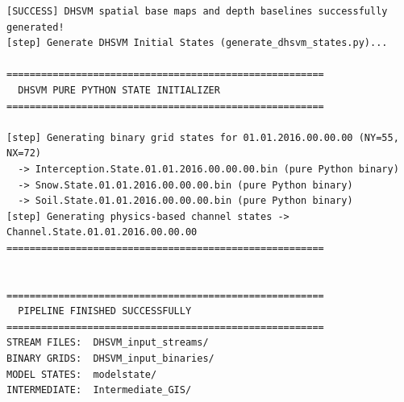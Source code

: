 \documentclass[11pt]{article}
\begin{document}
\begin{lstlisting}[style=bashstyle,caption={Full console log of the DHSVM spatial pipeline execution.}]
[SUCCESS] DHSVM spatial base maps and depth baselines successfully generated!
[step] Generate DHSVM Initial States (generate_dhsvm_states.py)...

=======================================================
  DHSVM PURE PYTHON STATE INITIALIZER
=======================================================

[step] Generating binary grid states for 01.01.2016.00.00.00 (NY=55, NX=72)
  -> Interception.State.01.01.2016.00.00.00.bin (pure Python binary)
  -> Snow.State.01.01.2016.00.00.00.bin (pure Python binary)
  -> Soil.State.01.01.2016.00.00.00.bin (pure Python binary)
[step] Generating physics-based channel states -> Channel.State.01.01.2016.00.00.00
=======================================================


=======================================================
  PIPELINE FINISHED SUCCESSFULLY
=======================================================
STREAM FILES:  DHSVM_input_streams/
BINARY GRIDS:  DHSVM_input_binaries/
MODEL STATES:  modelstate/
INTERMEDIATE:  Intermediate_GIS/
\end{lstlisting}
\end{document}
